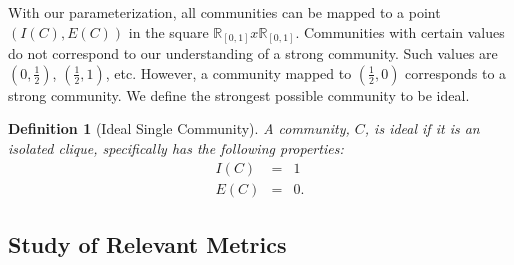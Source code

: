 \documentclass[phd,tocprelim]{cornell}
\newtheorem{definition}{Definition}
\begin{document}
With our parameterization, all communities can be mapped to a point $(I(C), E(C))$ in the square $\mathbb{R}_{[0, 1]} x \mathbb{R}_{[0, 1]}$.   Communities with certain values do not correspond to our understanding of a strong community.  Such values are $\left(0, \frac{1}{2}\right)$, $\left(\frac{1}{2}, 1\right)$, etc.  However, a community mapped to $\left(\frac{1}{2}, 0\right)$ corresponds to a strong community.  We define the strongest possible community to be ideal.
\begin{definition}[Ideal Single Community]
A community, $C$, is ideal if it is an isolated clique, specifically has the following properties:
\begin{eqnarray*}
I(C) &=& 1\\
E(C) &=& 0.
\end{eqnarray*}
\end{definition}


\subsection{Study of Relevant Metrics}
\end{document}
